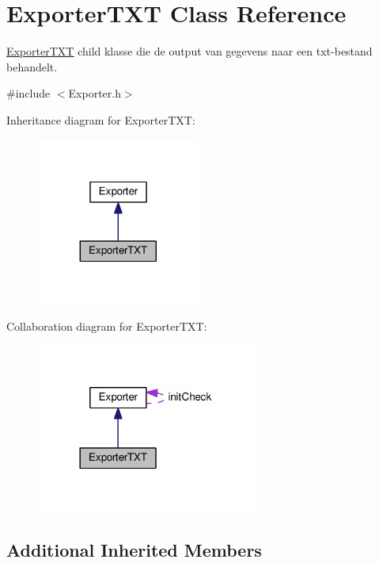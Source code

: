 \hypertarget{class_exporter_t_x_t}{}\section{Exporter\+T\+XT Class Reference}
\label{class_exporter_t_x_t}


\hyperlink{class_exporter_t_x_t}{Exporter\+T\+XT} child klasse die de output van gegevens naar een txt-\/bestand behandelt.  




{\ttfamily \#include $<$Exporter.\+h$>$}



Inheritance diagram for Exporter\+T\+XT\+:
\nopagebreak
\begin{figure}[H]
\begin{center}
\leavevmode
\includegraphics[width=152pt]{class_exporter_t_x_t__inherit__graph}
\end{center}
\end{figure}


Collaboration diagram for Exporter\+T\+XT\+:
\nopagebreak
\begin{figure}[H]
\begin{center}
\leavevmode
\includegraphics[width=206pt]{class_exporter_t_x_t__coll__graph}
\end{center}
\end{figure}
\subsection*{Additional Inherited Members}


